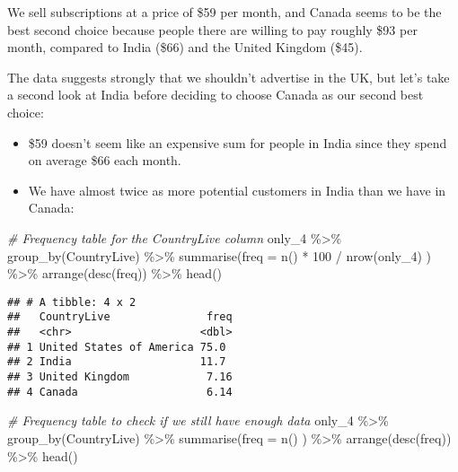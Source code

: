 \documentclass[
]{article}
\newenvironment{Shaded}{\begin{snugshade}}{\end{snugshade}}
\newcommand{\AttributeTok}[1]{\textcolor[rgb]{0.77,0.63,0.00}{#1}}
\newcommand{\CommentTok}[1]{\textcolor[rgb]{0.56,0.35,0.01}{\textit{#1}}}
\newcommand{\DecValTok}[1]{\textcolor[rgb]{0.00,0.00,0.81}{#1}}
\newcommand{\FunctionTok}[1]{\textcolor[rgb]{0.00,0.00,0.00}{#1}}
\newcommand{\NormalTok}[1]{#1}
\newcommand{\SpecialCharTok}[1]{\textcolor[rgb]{0.00,0.00,0.00}{#1}}
\providecommand{\tightlist}{%
  \setlength{\itemsep}{0pt}\setlength{\parskip}{0pt}}
\begin{document}
We sell subscriptions at a price of \$59 per month, and Canada seems to
be the best second choice because people there are willing to pay
roughly \$93 per month, compared to India (\$66) and the United Kingdom
(\$45).

The data suggests strongly that we shouldn't advertise in the UK, but
let's take a second look at India before deciding to choose Canada as
our second best choice:

\begin{itemize}
\tightlist
\item
  \$59 doesn't seem like an expensive sum for people in India since they
  spend on average \$66 each month.
\item
  We have almost twice as more potential customers in India than we have
  in Canada:
\end{itemize}

\begin{Shaded}
\begin{Highlighting}[]
\CommentTok{\# Frequency table for the \textquotesingle{}CountryLive\textquotesingle{} column}
\NormalTok{only\_4 }\SpecialCharTok{\%\textgreater{}\%} \FunctionTok{group\_by}\NormalTok{(CountryLive) }\SpecialCharTok{\%\textgreater{}\%}
  \FunctionTok{summarise}\NormalTok{(}\AttributeTok{freq =} \FunctionTok{n}\NormalTok{() }\SpecialCharTok{*} \DecValTok{100} \SpecialCharTok{/} \FunctionTok{nrow}\NormalTok{(only\_4) ) }\SpecialCharTok{\%\textgreater{}\%}
  \FunctionTok{arrange}\NormalTok{(}\FunctionTok{desc}\NormalTok{(freq)) }\SpecialCharTok{\%\textgreater{}\%}
  \FunctionTok{head}\NormalTok{()}
\end{Highlighting}
\end{Shaded}

\begin{verbatim}
## # A tibble: 4 x 2
##   CountryLive               freq
##   <chr>                    <dbl>
## 1 United States of America 75.0 
## 2 India                    11.7 
## 3 United Kingdom            7.16
## 4 Canada                    6.14
\end{verbatim}

\begin{Shaded}
\begin{Highlighting}[]
\CommentTok{\# Frequency table to check if we still have enough data}
\NormalTok{only\_4 }\SpecialCharTok{\%\textgreater{}\%} \FunctionTok{group\_by}\NormalTok{(CountryLive) }\SpecialCharTok{\%\textgreater{}\%}
  \FunctionTok{summarise}\NormalTok{(}\AttributeTok{freq =} \FunctionTok{n}\NormalTok{() ) }\SpecialCharTok{\%\textgreater{}\%}
  \FunctionTok{arrange}\NormalTok{(}\FunctionTok{desc}\NormalTok{(freq)) }\SpecialCharTok{\%\textgreater{}\%}
  \FunctionTok{head}\NormalTok{()}
\end{Highlighting}
\end{Shaded}
\end{document}
